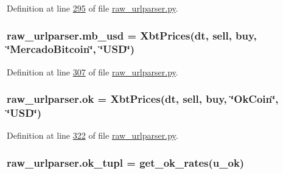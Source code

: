 Definition at line \hyperlink{raw__urlparser_8py_source_l00295}{295} of file \hyperlink{raw__urlparser_8py_source}{raw\+\_\+urlparser.\+py}.

\subsubsection[{\texorpdfstring{mb\+\_\+usd}{mb_usd}}]{\setlength{\rightskip}{0pt plus 5cm}raw\+\_\+urlparser.\+mb\+\_\+usd = {\bf Xbt\+Prices}({\bf dt}, {\bf sell}, {\bf buy}, \char`\"{}Mercado\+Bitcoin\char`\"{}, \char`\"{}U\+SD\char`\"{})}\hypertarget{namespaceraw__urlparser_adb426668060d85f4fbd24135e258a8b3}{}\label{namespaceraw__urlparser_adb426668060d85f4fbd24135e258a8b3}


Definition at line \hyperlink{raw__urlparser_8py_source_l00307}{307} of file \hyperlink{raw__urlparser_8py_source}{raw\+\_\+urlparser.\+py}.

\subsubsection[{\texorpdfstring{ok}{ok}}]{\setlength{\rightskip}{0pt plus 5cm}raw\+\_\+urlparser.\+ok = {\bf Xbt\+Prices}({\bf dt}, {\bf sell}, {\bf buy}, \char`\"{}Ok\+Coin\char`\"{}, \char`\"{}U\+SD\char`\"{})}\hypertarget{namespaceraw__urlparser_aa0dcadbc04ec5d09f7a2dabb865000c8}{}\label{namespaceraw__urlparser_aa0dcadbc04ec5d09f7a2dabb865000c8}


Definition at line \hyperlink{raw__urlparser_8py_source_l00322}{322} of file \hyperlink{raw__urlparser_8py_source}{raw\+\_\+urlparser.\+py}.

\subsubsection[{\texorpdfstring{ok\+\_\+tupl}{ok_tupl}}]{\setlength{\rightskip}{0pt plus 5cm}raw\+\_\+urlparser.\+ok\+\_\+tupl = {\bf get\+\_\+ok\+\_\+rates}({\bf u\+\_\+ok})}\hypertarget{namespaceraw__urlparser_a511386d80b04970417c26b6493bd2475}{}\label{namespaceraw__urlparser_a511386d80b04970417c26b6493bd2475}


